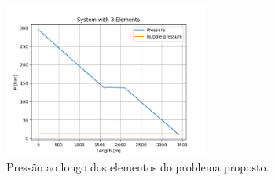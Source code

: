 \documentclass[final,3p]{elsarticle}
\numberwithin{equation}{section}
\begin{document}
        \begin{figure}
          \centering
          \includegraphics[width=0.6\textwidth]{flow/system1_operation.png}
          \caption{Pressão ao longo dos elementos do problema proposto.}
          \label{fig:pressao}
        \end{figure}
\end{document}
